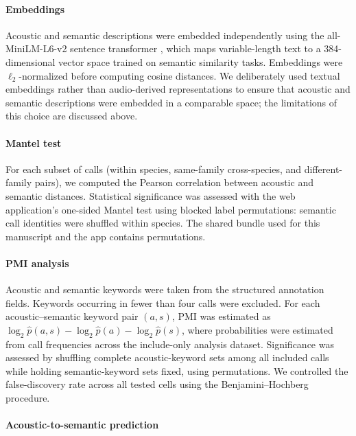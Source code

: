 \documentclass[external]{esp-paper}
\begin{document}
\paragraph{Embeddings}

Acoustic and semantic descriptions were embedded independently using the all-MiniLM-L6-v2 sentence transformer \cite{reimers2019sentence}, which maps variable-length text to a 384-dimensional vector space trained on semantic similarity tasks. Embeddings were $\ell_2$-normalized before computing cosine distances. We deliberately used textual embeddings rather than audio-derived representations to ensure that acoustic and semantic descriptions were embedded in a comparable space; the limitations of this choice are discussed above.

\paragraph{Mantel test}

For each subset of calls (within species, same-family cross-species, and different-family pairs), we computed the Pearson correlation between acoustic and semantic distances. Statistical significance was assessed with the web application's one-sided Mantel test using blocked label permutations: semantic call identities were shuffled within species. The shared bundle used for this manuscript and the app contains \npermutations permutations.

\paragraph{PMI analysis}

Acoustic and semantic keywords were taken from the structured annotation fields. Keywords occurring in fewer than four calls were excluded. For each acoustic--semantic keyword pair $(a, s)$, PMI was estimated as $\log_2 \hat{p}(a,s) - \log_2 \hat{p}(a) - \log_2 \hat{p}(s)$, where probabilities were estimated from call frequencies across the include-only analysis dataset. Significance was assessed by shuffling complete acoustic-keyword sets among all included calls while holding semantic-keyword sets fixed, using \npermutations permutations. We controlled the false-discovery rate across all tested cells using the Benjamini--Hochberg procedure.

\paragraph{Acoustic-to-semantic prediction}
\end{document}
